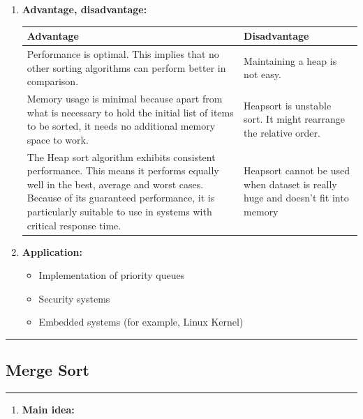 \documentclass[11pt,a4paper]{article}
\begin{document}
{\begin{enumerate}[label=\textbf{\arabic*})]
					Levcopoulos and Petersson describe a variation of heapsort based on a Cartesian tree that does not add an element to the heap until smaller values on both sides of it have already been included in the sorted output. As they show, this modification can allow the algorithm to sort more quickly than O(n log n) for inputs that are already nearly sorted.
				\item \textbf{Advantage, disadvantage:}
					\begin{table}[H]
						\centering
						\begin{tabular}{|p{8cm}|p{8cm}|}
							\hline
							\textbf{Advantage} & \textbf{Disadvantage} \\
							\hline
							\hline
							Performance is optimal. This implies that no other sorting algorithms can perform better in comparison. & Maintaining a heap is not easy. \\[12pt]
							Memory usage is minimal because apart from what is necessary to hold the initial list of items to be sorted, it needs no additional memory space to work. & Heapsort is unstable sort. It might rearrange the relative order.\\[12pt]
							The Heap sort algorithm exhibits consistent performance. This means it performs equally well in the best, average and worst cases. Because of its guaranteed performance, it is particularly suitable to use in systems with critical response time. & Heapsort cannot be used when dataset is really huge and doesn't fit into memory\\
							\hline
						\end{tabular}
					\end{table}
				\item \textbf{Application:}	
					\begin{itemize}
						\item Implementation of priority queues
						\item Security systems
						\item Embedded systems (for example, Linux Kernel)
					\end{itemize}
			\end{enumerate}
		
		\rule{15cm}{0.1cm}
		\subsection{Merge Sort}
		\rule{15cm}{0.1cm}
			\begin{enumerate}[label=\textbf{\arabic*})]
				\item \textbf{Main idea:}
				

\end{enumerate}}
\end{document}
